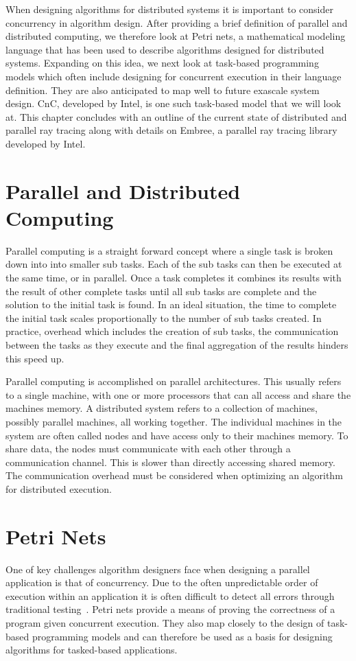 When designing algorithms for distributed systems it is important to consider 
concurrency in algorithm design.  After providing a brief definition of parallel
and distributed computing, we therefore look at Petri nets, a mathematical 
modeling language that has been used to describe algorithms designed for 
distributed systems.  Expanding on this idea, we next look at task-based 
programming models which often include designing for concurrent execution in
their language definition.  They are also anticipated to map well to future 
exascale system design.  CnC, developed by Intel, is one such task-based model 
that we will look at.  This chapter concludes with an outline of the current 
state of distributed and parallel ray tracing along with details on Embree, a
parallel ray tracing library developed by Intel.

\section{Parallel and Distributed Computing}
\label{computing}

Parallel computing is a straight forward concept where a single task is broken 
down into into smaller sub tasks.  Each of the sub tasks can then be executed at
the same time, or in parallel.  Once a task completes it combines its results 
with the result of other complete tasks until all sub tasks are complete and the
solution to the initial task is found.  In an ideal situation, the time to 
complete the initial task scales proportionally to the number of sub tasks 
created.  In practice, overhead which includes the creation of sub tasks, 
the communication between the tasks as they execute and the final aggregation of 
the results hinders this speed up.

Parallel computing is accomplished on parallel architectures.  This usually 
refers to a single machine, with one or more processors that can all access and
share the machines memory.  A distributed system refers to a collection of
machines, possibly parallel machines, all working together.  The individual 
machines in the system are often called nodes and have access only to their 
machines memory.  To share data, the nodes must communicate with each other
through a communication channel. This is slower than directly accessing shared
memory.  The communication overhead must be considered when optimizing an 
algorithm for distributed execution.

\section{Petri Nets}
\label{sec:petri-nets}
One of key challenges algorithm designers face when designing a parallel 
application is that of concurrency.  Due to the often unpredictable order of
execution within an application it is often difficult to detect all errors 
through traditional testing~\cite{franco2012true}.  Petri nets provide a means 
of proving the correctness of a program given concurrent execution.  They also 
map closely to the design of task-based programming models and can therefore be 
used as a basis for designing algorithms for tasked-based applications.

